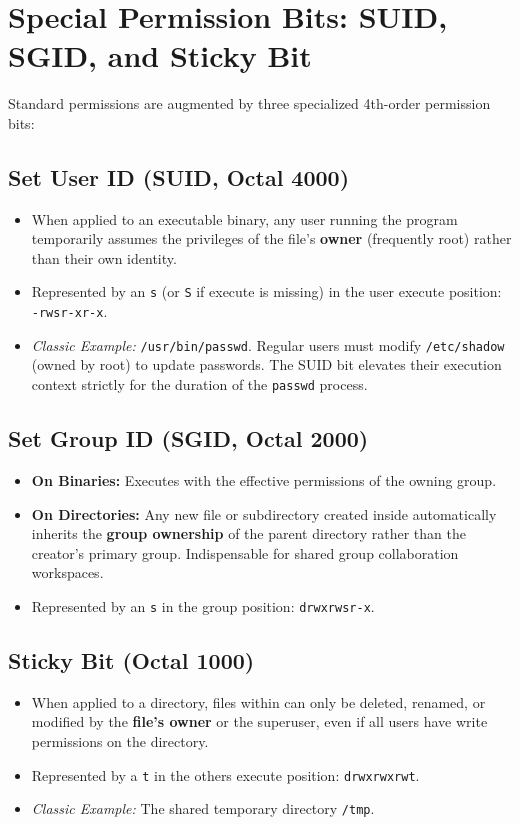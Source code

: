 \section{Special Permission Bits: SUID, SGID, and Sticky Bit}
Standard permissions are augmented by three specialized 4th-order permission bits:

\subsection{Set User ID (SUID, Octal 4000)}
\begin{itemize}[leftmargin=1.5em]
    \item When applied to an executable binary, any user running the program temporarily assumes the privileges of the file's \textbf{owner} (frequently root) rather than their own identity.
    \item Represented by an \texttt{s} (or \texttt{S} if execute is missing) in the user execute position: \texttt{-rwsr-xr-x}.
    \item \textit{Classic Example:} \texttt{/usr/bin/passwd}. Regular users must modify \texttt{/etc/shadow} (owned by root) to update passwords. The SUID bit elevates their execution context strictly for the duration of the \texttt{passwd} process.
\end{itemize}

\subsection{Set Group ID (SGID, Octal 2000)}
\begin{itemize}[leftmargin=1.5em]
    \item \textbf{On Binaries:} Executes with the effective permissions of the owning group.
    \item \textbf{On Directories:} Any new file or subdirectory created inside automatically inherits the \textbf{group ownership} of the parent directory rather than the creator's primary group. Indispensable for shared group collaboration workspaces.
    \item Represented by an \texttt{s} in the group position: \texttt{drwxrwsr-x}.
\end{itemize}

\subsection{Sticky Bit (Octal 1000)}
\begin{itemize}[leftmargin=1.5em]
    \item When applied to a directory, files within can only be deleted, renamed, or modified by the \textbf{file's owner} or the superuser, even if all users have write permissions on the directory.
    \item Represented by a \texttt{t} in the others execute position: \texttt{drwxrwxrwt}.
    \item \textit{Classic Example:} The shared temporary directory \texttt{/tmp}.
\end{itemize}

